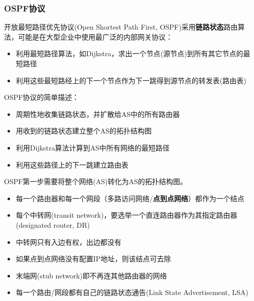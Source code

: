 \subsubsection{OSPF协议}
开放最短路径优先协议(Open Shortest Path First, OSPF)采用\textbf{链路状态}路由算法，可能是在大型企业中使用最广泛的内部网关协议：
\begin{itemize}
	\item 利用最短路径算法，如Dijkstra，求出一个节点(源节点)到所有其它节点的最短路径
	\item 利用这些最短路经上的下一个节点作为下一跳得到源节点的转发表(路由表)
\end{itemize}

OSPF协议的简单描述：
\begin{itemize}
\item 周期性地收集链路状态，并扩散给AS中的所有路由器
\item 用收到的链路状态建立整个AS的拓扑结构图
\item 利用Dijkstra算法计算到AS中所有网络的最短路径
\item 利用这些路径上的下一跳建立路由表
\end{itemize}

OSPF第一步需要将整个网络(AS)转化为AS的拓扑结构图。
\begin{itemize}
	\item 每一个路由器和每一个网段（多路访问网络/\textbf{点到点网络}）都作为一个结点
	\item 每个中转网(transit network)，要选举一个直连路由器作为其指定路由器(designated router, DR)
	\item 中转网只有入边有权，出边都没有
	\item 如果点到点网络没有配置IP地址，则该结点可去除
	\item 末端网(stub network)即不再连其他路由器的网络
	\item 每一个路由/网段都有自己的链路状态通告(Link State Advertisement, LSA)
\end{itemize}

